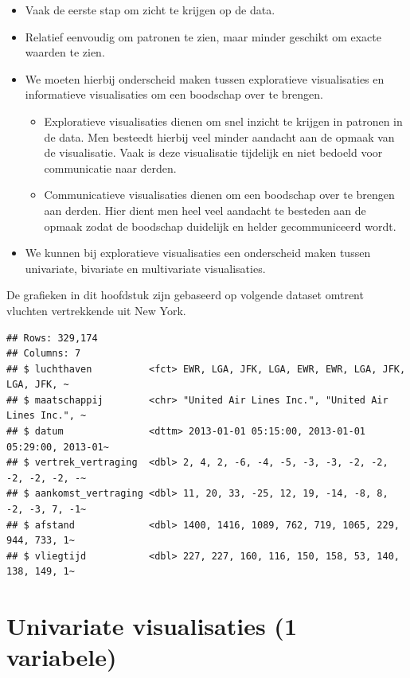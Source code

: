 \documentclass[]{tufte-book}
\providecommand{\tightlist}{%
  \setlength{\itemsep}{0pt}\setlength{\parskip}{0pt}}
\begin{document}
\begin{itemize}
\tightlist
\item
  Vaak de eerste stap om zicht te krijgen op de data.
\item
  Relatief eenvoudig om patronen te zien, maar minder geschikt om exacte waarden te zien.
\item
  We moeten hierbij onderscheid maken tussen exploratieve visualisaties en informatieve visualisaties om een boodschap over te brengen.

  \begin{itemize}
  \tightlist
  \item
    Exploratieve visualisaties dienen om snel inzicht te krijgen in patronen in de data. Men besteedt hierbij veel minder aandacht aan de opmaak van de visualisatie. Vaak is deze visualisatie tijdelijk en niet bedoeld voor communicatie naar derden.
  \item
    Communicatieve visualisaties dienen om een boodschap over te brengen aan derden. Hier dient men heel veel aandacht te besteden aan de opmaak zodat de boodschap duidelijk en helder gecommuniceerd wordt.
  \end{itemize}
\item
  We kunnen bij exploratieve visualisaties een onderscheid maken tussen univariate, bivariate en multivariate visualisaties.
\end{itemize}

De grafieken in dit hoofdstuk zijn gebaseerd op volgende dataset omtrent vluchten vertrekkende uit New York.

\begin{verbatim}
## Rows: 329,174
## Columns: 7
## $ luchthaven          <fct> EWR, LGA, JFK, LGA, EWR, EWR, LGA, JFK, LGA, JFK, ~
## $ maatschappij        <chr> "United Air Lines Inc.", "United Air Lines Inc.", ~
## $ datum               <dttm> 2013-01-01 05:15:00, 2013-01-01 05:29:00, 2013-01~
## $ vertrek_vertraging  <dbl> 2, 4, 2, -6, -4, -5, -3, -3, -2, -2, -2, -2, -2, -~
## $ aankomst_vertraging <dbl> 11, 20, 33, -25, 12, 19, -14, -8, 8, -2, -3, 7, -1~
## $ afstand             <dbl> 1400, 1416, 1089, 762, 719, 1065, 229, 944, 733, 1~
## $ vliegtijd           <dbl> 227, 227, 160, 116, 150, 158, 53, 140, 138, 149, 1~
\end{verbatim}

\hypertarget{univariate-visualisaties-1-variabele}{%
\section{Univariate visualisaties (1 variabele)}\label{univariate-visualisaties-1-variabele}}
\end{document}
